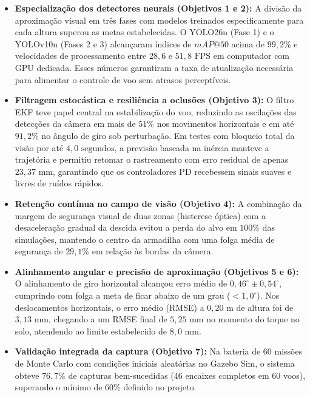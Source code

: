 \begin{itemize}
	\item \textbf{Especialização dos detectores neurais (Objetivos 1 e 2):} A divisão da aproximação visual em três fases com modelos treinados especificamente para cada altura superou as metas estabelecidas. O YOLO26n (Fase 1) e o YOLOv10n (Fases 2 e 3) alcançaram índices de $mAP@50$ acima de $99,2\%$ e velocidades de processamento entre $28,6$ e $51,8\text{ FPS}$ em computador com GPU dedicada. Esses números garantiram a taxa de atualização necessária para alimentar o controle de voo sem atrasos perceptíveis.
	
	\item \textbf{Filtragem estocástica e resiliência a oclusões (Objetivo 3):} O filtro EKF teve papel central na estabilização do voo, reduzindo as oscilações das detecções da câmera em mais de $51\%$ nos movimentos horizontais e em até $91,2\%$ no ângulo de giro sob perturbação. Em testes com bloqueio total da visão por até $4,0\text{ segundos}$, a previsão baseada na inércia manteve a trajetória e permitiu retomar o rastreamento com erro residual de apenas $23,37\text{ mm}$, garantindo que os controladores PD recebessem sinais suaves e livres de ruídos rápidos.
	
	\item \textbf{Retenção contínua no campo de visão (Objetivo 4):} A combinação da margem de segurança visual de duas zonas (histerese óptica) com a desaceleração gradual da descida evitou a perda do alvo em $100\%$ das simulações, mantendo o centro da armadilha com uma folga média de segurança de $29,1\%$ em relação às bordas da câmera.
	
	\item \textbf{Alinhamento angular e precisão de aproximação (Objetivos 5 e 6):} O alinhamento de giro horizontal alcançou erro médio de $0,46^\circ \pm 0,54^\circ$, cumprindo com folga a meta de ficar abaixo de um grau ($< 1,0^\circ$). Nos deslocamentos horizontais, o erro médio (RMSE) a $0,20\text{ m}$ de altura foi de $3,13\text{ mm}$, chegando a um RMSE final de $5,25\text{ mm}$ no momento do toque no solo, atendendo ao limite estabelecido de $8,0\text{ mm}$.
	
	\item \textbf{Validação integrada da captura (Objetivo 7):} Na bateria de 60 missões de Monte Carlo com condições iniciais aleatórias no Gazebo Sim, o sistema obteve $76,7\%$ de capturas bem-sucedidas (46 encaixes completos em 60 voos), superando o mínimo de $60\%$ definido no projeto.
\end{itemize}

